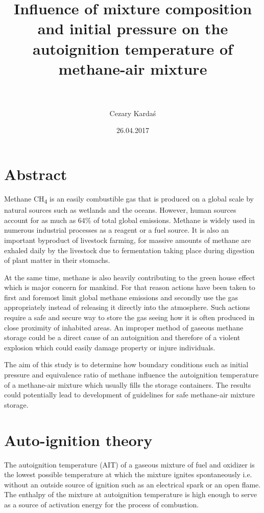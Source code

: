 \documentclass[a4paper]{article}[11pt]
\title{Influence of mixture composition and initial pressure on the autoignition temperature of methane-air mixture}
\date{26.04.2017}
\author{\\
\\
Cezary Kardaś}
\begin{document}
	\maketitle
    \newpage    
  

	\newpage
    
    \section{Abstract}
    	
	Methane  CH\textsubscript{4} is an easily combustible gas that is produced on a global scale by natural sources such as wetlands and the oceans. However, human sources account for as much as 64\%  of total global emissions. Methane is widely used in numerous industrial processes as a reagent or a fuel source. It is also an important byproduct of livestock farming, for massive amounts of methane are exhaled daily by the livestock due to fermentation taking place during digestion of plant matter in their stomachs.\par 
    At the same time, methane is also heavily contributing to the green house effect which is major concern for mankind. For that reason actions have been taken to first and foremost limit global methane emissions and secondly use the gas appropriately instead of releasing it directly into the atmosphere. Such actions require a safe and secure way to store the gas seeing how it is often produced in close proximity of inhabited areas. An improper method of gaseous methane storage could be a direct cause of an autoignition and therefore of a violent explosion which could easily damage property or injure individuals. \par 
    The aim of this study is to determine how boundary conditions such as initial pressure and equivalence ratio of methane influence the autoignition temperature of a methane-air mixture which usually fills the storage containers. The results could potentially lead to development of guidelines for safe methane-air mixture storage.   \par 
    
      
    \section{Auto-ignition theory}
    The autoignition temperature (AIT) of a gaseous mixture of fuel and oxidizer is the lowest possible temperature at which the mixture ignites spontaneously i.e. without an outside source of ignition such as an electrical spark or an open flame. The enthalpy of the mixture at autoignition temperature is high enough to serve as a source of activation energy for the process of combustion. \par
    
\end{document}
